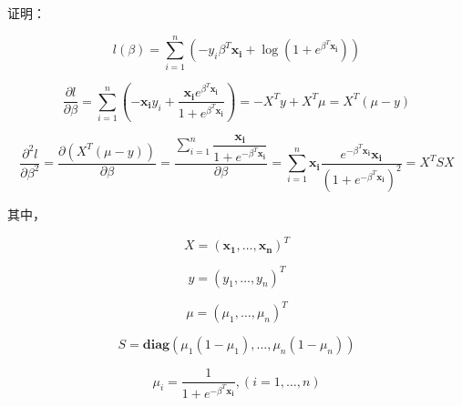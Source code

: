 \documentclass[12pt,a4paper]{article}
\begin{document}
	\noindent 证明：
	\par $$l(\beta) = \sum\limits_{i=1}^{n}(-y_{i} \beta^{T}\bm{x_{i}} + \log(1+e^{\beta ^{T}\bm{x_{i}}})) $$
	\par $$\dfrac{\partial l}{\partial \beta} = \sum\limits_{i=1}^{n}(-\bm{x_{i}}y_{i}+ \dfrac{\bm{x_{i}}e^{\beta ^{T}\bm{x_{i}}}}{1+e^{\beta ^{T}\bm{x_{i}}}}) =-X^{T}y + X^{T} \mu=X^{T}(\mu -y)$$
	\par $$ \dfrac{\partial ^{2} l}{\partial \beta^{2}} = \dfrac{\partial (X^{T}(\mu - y))}{\partial \beta} =\dfrac{\sum\limits_{i=1}^{n} \dfrac{\bm{x_{i}}}{1+e^{-\beta ^{T}\bm{x_{i}}}}}{\partial \beta} = \sum\limits_{i=1}^{n}\bm{x_{i}}\dfrac{e^{-\beta^{T}\bm{x_{i}}}\bm{x_{i}}}{(1+e^{-\beta ^{T}\bm{x_{i}}})^{2}} = X^{T}SX$$
	\par \noindent 其中，
	\par $$X = (\bm{x_{1}},\dots,\bm{x_{n}})^{T} $$
	\par $$y = (y_{1}, \dots , y_{n})^{T}   $$
	\par $$\mu = (\mu_{1},\dots,\mu_{n})^{T}  $$ 
	\par $$ S=\bm{diag}(\mu_{1}(1-\mu_{1}),\dots,\mu_{n}(1-\mu_{n}) ) $$
	\par $$\mu_{i} = \dfrac{1}{1+e^{-\beta ^{T}\bm{x_{i}}}} ,(i=1,\dots,n)$$
\end{document}
